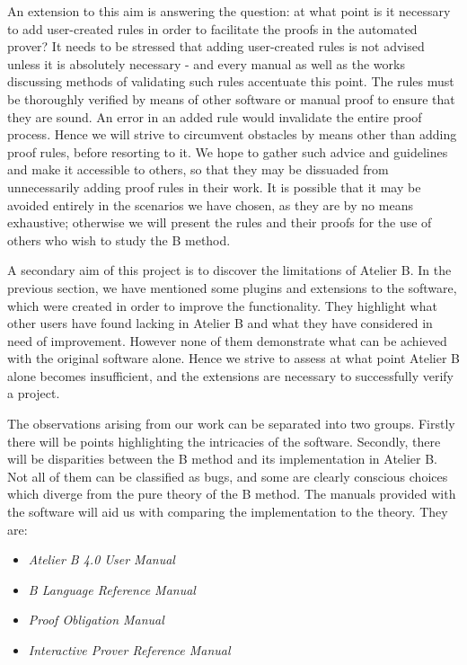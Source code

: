 \documentclass[12pt,journal,duplex]{IEEEtran}
\begin{document}
	An extension to this aim is answering the question: at what point is it necessary to add user-created rules in order to facilitate the proofs in the automated prover? It needs to be stressed that adding user-created rules is not advised unless it is absolutely necessary - and every manual as well as the works discussing methods of validating such rules accentuate this point. The rules must be thoroughly verified by means of other software or manual proof to ensure that they are sound. An error in an added rule would invalidate the entire proof process. Hence we will strive to circumvent obstacles by means other than adding proof rules, before resorting to it. We hope to gather such advice and guidelines and make it accessible to others, so that they may be dissuaded from unnecessarily adding proof rules in their work. It is possible that it may be avoided entirely in the scenarios we have chosen, as they are by no means exhaustive; otherwise we will present the rules and their proofs for the use of others who wish to study the B method.
	
	A secondary aim of this project is to discover the limitations of Atelier B. In the previous section, we have mentioned some plugins and extensions to the software, which were created in order to improve the functionality. They highlight what other users have found lacking in Atelier B and what they have considered in need of improvement. However none of them demonstrate what can be achieved with the original software alone. Hence we strive to assess at what point Atelier B alone becomes insufficient, and the extensions are necessary to successfully verify a project.

	The observations arising from our work can be separated into two groups. Firstly there will be points highlighting the intricacies of the software. Secondly, there will be disparities between the B method and its implementation in Atelier B. Not all of them can be classified as bugs, and some are clearly conscious choices which diverge from the pure theory of the B method. The manuals provided with the software will aid us with comparing the implementation to the theory. They are:

	\begin{itemize}
		\item \emph{Atelier B 4.0 User Manual}
		\item \emph{B Language Reference Manual}
		\item \emph{Proof Obligation Manual}
		\item \emph{Interactive Prover Reference Manual}
	\end{itemize}
\end{document}
